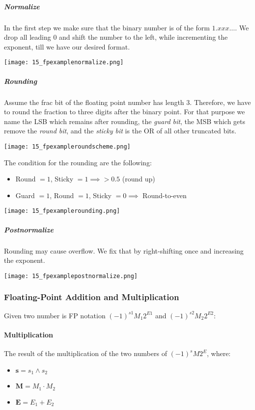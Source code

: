 \subparagraph{Normalize}
In the first step we make sure that the binary number is of the form $1.xxx\dots$. We drop all leading $0$ and shift the number to the left, while incrementing the exponent, till we have our desired format.

\texttt{[image: 15\_fpexamplenormalize.png]}

\subparagraph{Rounding}
Assume the frac bit of the floating point number has length $3$. Therefore, we have to round the fraction to three digits after the binary point. For that purpose we name the LSB which remains after rounding, the \textit{guard bit}, the MSB which gets remove the \textit{round bit}, and the \textit{sticky bit} is the OR of all other truncated bits.

\texttt{[image: 15\_fpexampleroundscheme.png]}

The condition for the rounding are the following:
\begin{itemize}
    \item Round $=1$, Sticky $=1 \implies > 0.5$ (round up)
    \item Guard $=1$, Round $=1$, Sticky $= 0 \implies$ Round-to-even
\end{itemize}

\texttt{[image: 15\_fpexamplerounding.png]}

\subparagraph{Postnormalize}
Rounding may cause overflow. We fix that by right-shifting once and increasing the exponent.

\texttt{[image: 15\_fpexamplepostnormalize.png]}

\subsubsection{Floating-Point Addition and Multiplication}
Given two number is FP notation $(-1)^{s1} M_1 2^{E1}$ and $(-1)^{s2} M_2 2^{E2}$:

\paragraph{Multiplication}
The result of the multiplication of the two numbers of $(-1)^s M 2^E$, where:
\begin{itemize}
    \item $\mathbf{s} = s_1 \land s_2$
    \item $\mathbf{M} = M_1 \cdot M_2$
    \item $\mathbf{E} = E_1 + E_2$
\end{itemize}

